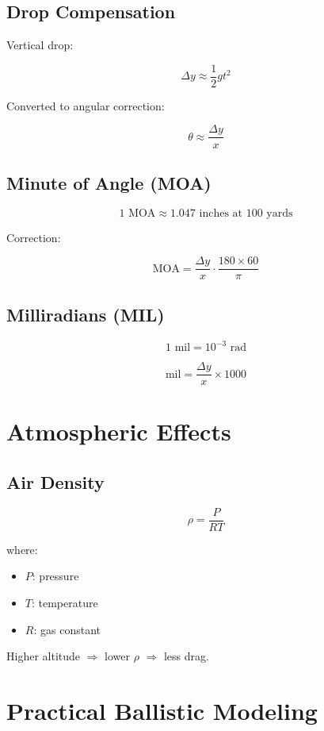 \documentclass[11pt]{article}
\begin{document}
	\subsection{Drop Compensation}
	
	Vertical drop:
	
	\[
	\Delta y \approx \frac{1}{2} g t^2
	\]
	
	Converted to angular correction:
	
	\[
	\theta \approx \frac{\Delta y}{x}
	\]
	
	\subsection{Minute of Angle (MOA)}
	
	\[
	1 \text{ MOA} \approx 1.047 \text{ inches at 100 yards}
	\]
	
	Correction:
	
	\[
	\text{MOA} = \frac{\Delta y}{x} \cdot \frac{180 \times 60}{\pi}
	\]
	
	\subsection{Milliradians (MIL)}
	
	\[
	1 \text{ mil} = 10^{-3} \text{ rad}
	\]
	
	\[
	\text{mil} = \frac{\Delta y}{x} \times 1000
	\]
	
	\section{Atmospheric Effects}
	
	\subsection{Air Density}
	
	\[
	\rho = \frac{P}{R T}
	\]
	
	where:
	\begin{itemize}
		\item $P$: pressure
		\item $T$: temperature
		\item $R$: gas constant
	\end{itemize}
	
	Higher altitude $\Rightarrow$ lower $\rho$ $\Rightarrow$ less drag.
	
	\section{Practical Ballistic Modeling}
	
\end{document}
